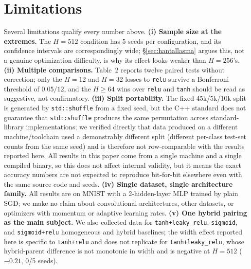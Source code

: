 \documentclass[9pt]{extarticle}
\begin{document}
\section{Limitations}
\label{sec:limits}
Several limitations qualify every number above. \textbf{(i) Sample size at
the extremes.} The \(H{=}512\) condition has 5 seeds per configuration, and
its confidence intervals are correspondingly wide; \S\ref{sec:hantallasma}
argues this, not a genuine optimization difficulty, is why its effect looks
weaker than \(H{=}256\)'s. \textbf{(ii) Multiple comparisons.} Table~2
reports twelve paired tests without correction; only the \(H{=}12\) and
\(H{=}32\) losses to \texttt{relu} survive a Bonferroni threshold of
\(0.05/12\), and the \(H\geq64\) wins over \texttt{relu} and \texttt{tanh}
should be read as suggestive, not confirmatory. \textbf{(iii) Split
portability.} The fixed 45k/5k/10k split is generated by
\texttt{std::shuffle} from a fixed seed, but the C++ standard does not
guarantee that \texttt{std::shuffle} produces the same permutation across
standard-library implementations; we verified directly that data produced on
a different machine/toolchain used a demonstrably different split (different
per-class test-set counts from the same seed) and is therefore not
row-comparable with the results reported here. All results in this paper
come from a single machine and a single compiled binary, so this does not
affect internal validity, but it means the exact accuracy numbers are not
expected to reproduce bit-for-bit elsewhere even with the same source code
and seeds. \textbf{(iv) Single dataset, single architecture family.} All
results are on MNIST with a 2-hidden-layer MLP trained by plain SGD; we make
no claim about convolutional architectures, other datasets, or optimizers
with momentum or adaptive learning rates. \textbf{(v) One hybrid pairing as
the main subject.} We also collected data for \texttt{tanh+leaky\_relu},
\texttt{sigmoid}, and \texttt{sigmoid+relu} homogeneous and hybrid baselines;
the width effect reported here is specific to \texttt{tanh+relu} and does not
replicate for \texttt{tanh+leaky\_relu}, whose hybrid-parent difference is
not monotonic in width and is negative at \(H{=}512\) ($-0.21$, 0/5 seeds).
\end{document}
